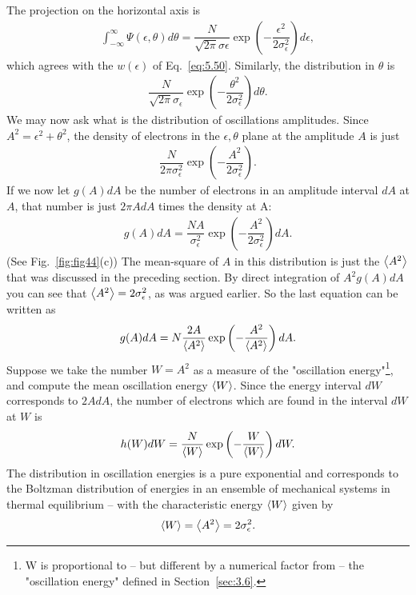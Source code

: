 The projection on the horizontal axis is
\begin{align}
	\int_{-\infty}^{\infty} \Psi(\epsilon,\theta) d\theta = \dfrac{N}{\sqrt{2\pi} \sigma\epsilon} \exp\left( -\dfrac{\epsilon^2}{2\sigma_\epsilon^2} \right) d\epsilon,
\end{align}
which agrees with the $w(\epsilon)$ of Eq.~\eqref{eq:5.50}. Similarly, the distribution in $\theta$ is
\begin{align}
	\dfrac{N}{\sqrt{2\pi} \sigma_\epsilon} \exp\left( -\dfrac{\theta^2}{2\sigma_\epsilon^2} \right) d\theta.
\end{align}
We may now ask what is the distribution of oscillations amplitudes. Since $A^2 = \epsilon^2 + \theta^2$, the density of electrons in the $\epsilon,\theta$ plane at the amplitude $A$ is just
\begin{align}
	\dfrac{N}{2\pi \sigma_\epsilon^2} \exp\left( -\dfrac{A^2}{2\sigma_\epsilon^2} \right).
\end{align}
If we now let $g(A)dA$ be the number of electrons in an amplitude interval $dA$ at $A$, that number is just $2\pi A dA$ times the density at A:
\begin{align}
	g(A) dA = \dfrac{N A}{\sigma_\epsilon^2} \exp\left( -\dfrac{A^2}{2\sigma_\epsilon^2} \right) dA.
\end{align}
(See Fig.~\ref{fig:fig44}(c)) The mean-square of $A$ in this distribution is just the $\left< A^2 \right>$ that was discussed in the preceding section. By direct integration of $A^2 g(A) dA$ you can see that $\left< A^2 \right> = 2\sigma_\epsilon^2$, as was argued earlier. So the last equation can be written as
\begin{align}
	g(A) dA = N \dfrac{2 A}{\left< A^2 \right>} \exp\left( -\dfrac{A^2}{\left< A^2 \right>} \right) dA.
\end{align}
Suppose we take the number $W = A^2$ as a measure of the "oscillation energy"\footnote{W is proportional to -- but different by a numerical factor from -- the "oscillation energy" defined in Section~\ref{sec:3.6}.}, and compute the mean oscillation energy $\left< W \right>$. Since the energy interval $dW$ corresponds to $2AdA$, the number of electrons which are found in the interval
 $dW$ at $W$ is
\begin{align} \label{eq:5.62}
	h(W)dW = \dfrac{N}{\left< W \right>}\exp\left( -\dfrac{W}{\left< W \right>} \right) dW.
\end{align}
The distribution
 in oscillation energies is a pure exponential and corresponds to the Boltzman distribution of energies in an ensemble of mechanical systems in thermal equilibrium -- with the characteristic
 energy $\left< W \right>$ given by
\begin{align}
	\left< W \right> = \left< A^2 \right> = 2 \sigma_\epsilon^2.
\end{align}
 
 
 